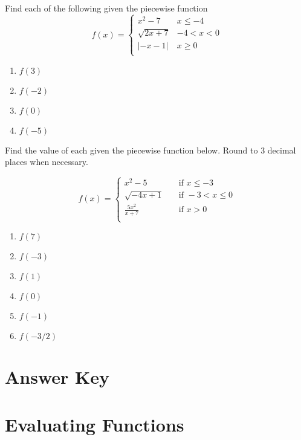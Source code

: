 Find each of the following given the piecewise function
\[f(x) = 
\begin{cases}
x^2-7 & x \leq -4 \\
\sqrt{2x+7} & -4 < x < 0 \\
|-x-1| & x \geq 0 \\
\end{cases}
\]
\begin{enumerate}	\setcounter{enumi}{\value{Review}}
\item $f(3)$
\item $f(-2)$
\item $f(0)$
\item $f(-5)$
\setcounter{Review}{\value{enumi}}
\end{enumerate}

Find the value of each given the piecewise function below. Round to 3 decimal places when necessary.

\[
 f(x) = 
 \begin{cases}
    x^2 - 5 \quad &\text{if } x \leq -3 \\[6pt]
    
    \sqrt{-4x + 1} \quad &\text{if } -3 < x \leq 0 \\[6pt]
    
    \frac{5x^2}{x+7} \quad &\text{if } x > 0 \\
 \end{cases}
\]

\begin{enumerate}	\setcounter{enumi}{\value{Review}}
\item $f(7)$
\item $f(-3)$
\item $f(1)$
\item $f(0)$
\item $f(-1)$
\item $f(-3/2)$
\end{enumerate}

\newpage

\section{Answer Key}

\section*{Evaluating Functions}

